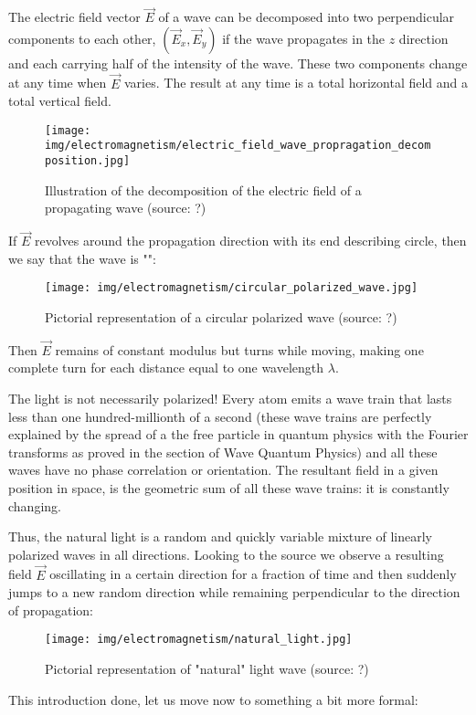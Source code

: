 	The electric field vector $\vec{E}$ of a wave can be decomposed into two perpendicular components to each other, $(\vec{E}_x,\vec{E}_y)$ if the wave propagates in the $z$ direction and each carrying half of the intensity of the wave. These two components change at any time when $\vec{E}$ varies. The result at any time is a total horizontal field and a total vertical field.
	\begin{figure}[H]
		\centering
		\texttt{[image: img/electromagnetism/electric\_field\_wave\_propragation\_decomposition.jpg]}
		\caption[Illustration of the decomposition of the electric field of a propagating wave]{Illustration of the decomposition of the electric field of a propagating wave (source: ?)}
	\end{figure}
	If $\vec{E}$ revolves around the propagation direction with its end describing circle, then we say that the wave is "":
	\begin{figure}[H]
		\centering
		\texttt{[image: img/electromagnetism/circular\_polarized\_wave.jpg]}
		\caption[Pictorial representation of a circular polarized wave]{Pictorial representation of a circular polarized wave (source: ?)}
	\end{figure}
	Then $\vec{E}$ remains of constant modulus but turns while moving, making one complete turn for each distance equal to one wavelength $\lambda$.
	\begin{tcolorbox}[title=Remark,colframe=black,arc=10pt]
	The light is not necessarily polarized! Every atom emits a wave train that lasts less than one hundred-millionth of a second (these wave trains are perfectly explained by the spread of a the free particle in quantum physics with the Fourier transforms as proved in the section of Wave Quantum Physics) and all these waves have no phase correlation or orientation. The resultant field in a given position in space, is the geometric sum of all these wave trains: it is constantly changing.
	\end{tcolorbox}
	Thus, the natural light is a random and quickly variable mixture of linearly polarized waves in all directions. Looking to the source we observe a resulting field $\vec{E}$ oscillating in a certain direction for a fraction of time and then suddenly jumps to a new random direction while remaining perpendicular to the direction of propagation:
	\begin{figure}[H]
		\centering
		\texttt{[image: img/electromagnetism/natural\_light.jpg]}
		\caption[Pictorial representation of "natural" light wave]{Pictorial representation of "natural" light wave (source: ?)}
	\end{figure}
	This introduction done, let us move now to something a bit more formal:

